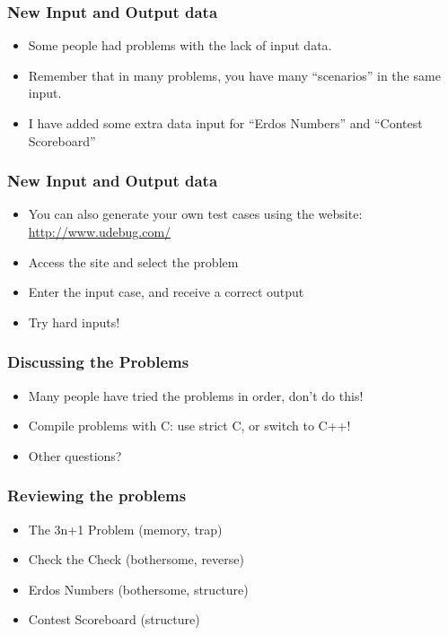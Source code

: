 \documentclass{beamer}
\begin{document}
\begin{frame}
  \frametitle{New Input and Output data}
  \begin{itemize}
  \item Some people had problems with the lack of input data.
    \vspace{.5cm}
  \item Remember that in many problems, you have many ``scenarios'' in
    the same input.
    \vspace{.5cm}
  \item I have added some extra data input for ``Erdos Numbers'' and
    ``Contest Scoreboard''
  \end{itemize}
\end{frame}

\begin{frame}
  \frametitle{New Input and Output data}
  \begin{itemize}
  \item You can also generate your own test cases using the website:
    \url{http://www.udebug.com/}
    \vspace{.5cm}
  \item Access the site and select the problem
    \vspace{.5cm}
  \item Enter the input case, and receive a correct output
    \vspace{.5cm}
  \item Try hard inputs!
  \end{itemize}
\end{frame}

\begin{frame}
  \frametitle{Discussing the Problems}
  \begin{itemize}
  \item Many people have tried the problems in order, don't do this!
    \vspace{.5cm}
  \item Compile problems with C: use strict C, or switch to C++!
    \vspace{.5cm}
  \item Other questions?
  \end{itemize}
\end{frame}

\begin{frame}
  \frametitle{Reviewing the problems}
  \begin{itemize}
  \item The 3n+1 Problem (memory, trap)
  \item Check the Check (bothersome, reverse)
  \item Erdos Numbers (bothersome, structure)
  \item Contest Scoreboard (structure)
  \end{itemize}
\end{frame}
\end{document}
